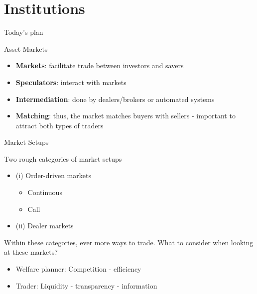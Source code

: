 \documentclass[english,10pt]{beamer}
\theoremstyle{definition}
\begin{document}
\section{Institutions}

\begin{frame}{Today's plan}
\tableofcontents[currentsection]
\end{frame}


\begin{frame}{Asset Markets}
\begin{itemize}
\item \textbf{Markets}: facilitate trade between investors and savers

\item \textbf{Speculators}: interact with markets

\item \textbf{Intermediation}: done by dealers/brokers or automated systems

\item \textbf{Matching}: thus, the market matches buyers with sellers - important to attract both types of traders

\end{itemize}
\end{frame}


\begin{frame}{Market Setups}

Two rough categories of market setups

\begin{itemize}

\item (i) Order-driven markets

\begin{itemize}
\item Continuous
\item Call
\end{itemize}

\item (ii) Dealer markets

\end{itemize}

Within these categories, ever more ways to trade. What to consider when looking at these markets?

\begin{itemize}
\item Welfare planner: Competition - efficiency 
\item Trader: Liquidity - transparency - information
\end{itemize}

\end{frame}
\end{document}

